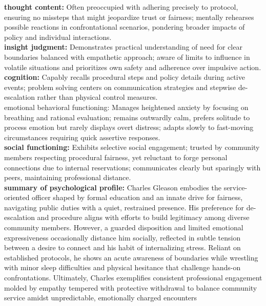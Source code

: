 \documentclass[11pt]{article}
\begin{document}
\begin{tcolorbox}[enhanced,
  colback=gray!5,
  colframe=black!75,
  fonttitle=\bfseries,
  title={Persona Inter Rater Agreement Example},
  boxrule=0.6pt,
  width=\columnwidth
]
\textbf{thought content:} Often preoccupied with adhering precisely to protocol, ensuring no missteps that might jeopardize trust or fairness; mentally rehearses possible reactions in confrontational scenarios, pondering broader impacts of policy and individual interactions. \\
\textbf{insight judgment:} Demonstrates practical understanding of need for clear boundaries balanced with empathetic approach; aware of limits to influence in volatile situations and prioritizes own safety and adherence over impulsive action. \\
\textbf{cognition:} Capably recalls procedural steps and policy details during active events; problem solving centers on communication strategies and stepwise de-escalation rather than physical control measures. \\
emotional behavioral functioning: Manages heightened anxiety by focusing on breathing and rational evaluation; remains outwardly calm, prefers solitude to process emotion but rarely displays overt distress; adapts slowly to fast-moving circumstances requiring quick assertive responses. \\
\textbf{social functioning:} Exhibits selective social engagement; trusted by community members respecting procedural fairness, yet reluctant to forge personal connections due to internal reservations; communicates clearly but sparingly with peers, maintaining professional distance. \\
\textbf{summary of psychological profile:} Charles Gleason embodies the service-oriented officer shaped by formal education and an innate drive for fairness, navigating public duties with a quiet, restrained presence. His preference for de-escalation and procedure aligns with efforts to build legitimacy among diverse community members. However, a guarded disposition and limited emotional expressiveness occasionally distance him socially, reflected in subtle tension between a desire to connect and his habit of internalizing stress. Reliant on established protocols, he shows an acute awareness of boundaries while wrestling with minor sleep difficulties and physical hesitance that challenge hands-on confrontations. Ultimately, Charles exemplifies consistent professional engagement molded by empathy tempered with protective withdrawal to balance community service amidst unpredictable, emotionally charged encounters 


\end{tcolorbox}
\end{document}
